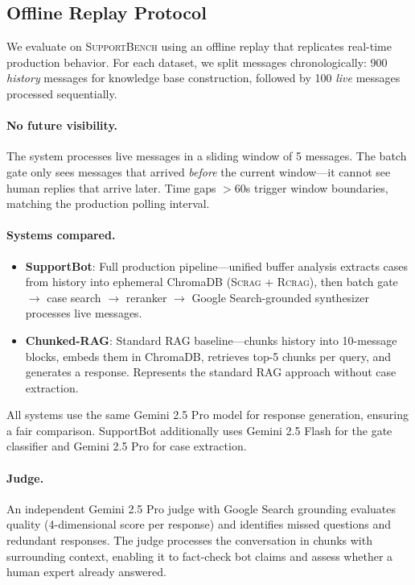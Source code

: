 \documentclass[11pt]{article}
\newcommand{\scrag}{\textsc{Scrag}}
\newcommand{\rcrag}{\textsc{Rcrag}}
\newcommand{\supportbench}{\textsc{SupportBench}}
\begin{document}
\subsection{Offline Replay Protocol}

We evaluate on \supportbench{} using an offline replay that replicates real-time production behavior. For each dataset, we split messages chronologically: 900 \emph{history} messages for knowledge base construction, followed by 100 \emph{live} messages processed sequentially.

\paragraph{No future visibility.} The system processes live messages in a sliding window of 5 messages. The batch gate only sees messages that arrived \emph{before} the current window---it cannot see human replies that arrive later. Time gaps $>$60s trigger window boundaries, matching the production polling interval.

\paragraph{Systems compared.}
\begin{itemize}
    \item \textbf{SupportBot}: Full production pipeline---unified buffer analysis extracts cases from history into ephemeral ChromaDB (\scrag{} + \rcrag{}), then batch gate $\to$ case search $\to$ reranker $\to$ Google Search-grounded synthesizer processes live messages.
    \item \textbf{Chunked-RAG}: Standard RAG baseline---chunks history into 10-message blocks, embeds them in ChromaDB, retrieves top-5 chunks per query, and generates a response. Represents the standard RAG approach without case extraction.
\end{itemize}

All systems use the same Gemini 2.5 Pro model for response generation, ensuring a fair comparison. SupportBot additionally uses Gemini 2.5 Flash for the gate classifier and Gemini 2.5 Pro for case extraction.

\paragraph{Judge.} An independent Gemini 2.5 Pro judge with Google Search grounding evaluates quality (4-dimensional score per response) and identifies missed questions and redundant responses. The judge processes the conversation in chunks with surrounding context, enabling it to fact-check bot claims and assess whether a human expert already answered.
\end{document}
